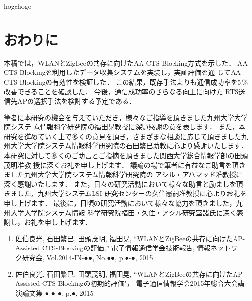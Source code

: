 \documentclass[12pt]{jreport}
\begin{document}
hogehoge

\chapter{おわりに}
\label{conclu}

本稿では，WLANとZigBeeの共存に向けたAA CTS Blocking方式を示した．
AA CTS Blockingを利用したデータ収集システムを実装し，実証評価を通
じてAA CTS Blockingの有効性を検証した．
この結果，既存手法よりも通信成功率を5\,\%改善できることを確認した．
今後，通信成功率のさらなる向上に向けた
RTS送信先APの選択手法を検討する予定である．

\acknowledgment
筆者に本研究の機会を与えていただき，様々なご指導を頂きました九州大学大学院システ
ム情報科学研究院の福田晃教授に深い感謝の意を表します．
また，本研究を進めていく上で多くの意見を頂き，さまざまな相談に応じて頂きました九
州大学大学院システム情報科学研究院の石田繁巳助教に心より感謝いたします．
本研究に対して多くのご助言とご指摘を頂きました関西大学総合情報学部の田頭茂明准教
授に深くお礼を申し上げます．
議論の場で筆者に有益なご助言を頂きました九州大学大学院システム情報科学研究院の
アシル・アハマッド准教授に深く感謝いたします．
また，日々の研究活動において様々な助言と励ましを頂きました，九州大学システムLSI
研究センターの久住憲嗣准教授に心よりお礼を申し上げます．
最後に，日頃の研究活動において様々な協力を頂きました，九州大学大学院システム情報
科学研究院福田・久住・アシル研究室諸氏に深く感謝し，お礼を申し上げます．




\publishedjournal
\begin{enumerate}%

\item{佐伯良光, 石田繁巳, 田頭茂明, 福田晃, 
``WLANとZigBeeの共存に向けたAP-Assisted CTS-Blockingの評価,'' 電子情報通信学会技術報告, 
情報ネットワーク研究会, Vol.2014-IN-●●, No.●●, p.●-●, 2015.}

\item{佐伯良光, 石田繁巳, 田頭茂明, 福田晃, ``WLANとZigBeeの共存に向けたAP-Assisted CTS-Blockingの初期的評価"，
電子通信情報学会2015年総合大会講演論文集 ●-●-●, p.●, 2015.}


\end{enumerate}
\end{document}
